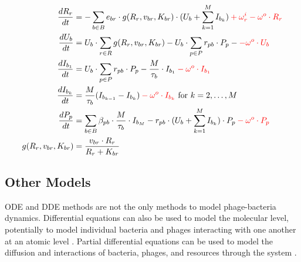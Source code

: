 \begin{equation} \label{eq:adapted_golding_model}
    \begin{aligned}
        \frac{dR_r}{dt} &= -\sum_{b \in B} e_{b r} \cdot g(R_r, v_{b r}, K_{b r})\cdot (U_b + \sum_{k=1}^{M} I_{b_k}) \mathcolor{red}{+ \omega^i_r -\omega^o \cdot R_r} \\
        \frac{dU_b}{dt} &= U_b \cdot \sum_{r \in R} g(R_r, v_{b r}, K_{b r}) - U_b \cdot \sum_{p \in P} r_{p b} \cdot P_p -\mathcolor{red}{-\omega^o \cdot U_b}\\
        \frac{dI_{b_1}}{dt} &= U_b \cdot \sum_{p \in P}r_{p b} \cdot P_p - \frac{M}{\tau_b}\cdot I_{b_1} \mathcolor{red}{-\omega^o \cdot I_{b_1}}\\
        \frac{dI_{b_k}}{dt} &= \frac{M}{\tau_b}(I_{b_{k-1}}-I_{b_k}) \mathcolor{red}{-\omega^o \cdot I_{b_k}}\text{ for } k=2, \dots, M \\
        \frac{dP_p}{dt} &= \sum_{b\in B}\beta_{p b}\cdot\frac{M}{\tau_b} \cdot I_{b_M} - r_{p b}\cdot(U_b + \sum_{k=1}^{M} I_{b_k})\cdot P_p \mathcolor{red}{-\omega^o \cdot P_p}\\
        g(R_r, v_{b r}, K_{b r}) &= \frac{v_{b r} \cdot R_r}{R_r + K_{b r}}
    \end{aligned}
\end{equation}

\subsection{Other Models}
ODE and DDE methods are not the only methods to model phage-bacteria dynamics. 
Differential equations can also be used to model the molecular level, potentially to model individual bacteria and phages interacting with one another at an atomic level \cite{scottInterdependenceCellGrowth2010, mayorgaReconstructionEndosomalOrganization2018}. 
Partial differential equations can be used to model the diffusion and interactions of bacteria, phages, and resources through the system \cite{kroneSpatialModelsStochastic2004, klannSpatialSimulationsSystems2012}. 